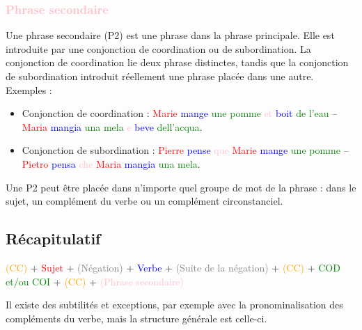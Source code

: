 \documentclass[12pt, openany]{report}
\begin{document}
\subsubsection{\textcolor{pink}{Phrase secondaire}}
Une phrase secondaire (P2) est une phrase dans la phrase principale. Elle est introduite par une conjonction de coordination ou de subordination. La conjonction de coordination lie deux phrase distinctes, tandis que la conjonction de subordination introduit réellement une phrase placée dans une autre.\\ Exemples : 
\begin{itemize}
    \item Conjonction de coordination : \textcolor{red}{Marie} \textcolor{blue}{mange} \textcolor{green}{une pomme} \textcolor{pink}{et} \textcolor{blue}{boit} \textcolor{green}{de l'eau} -- \textcolor{red}{Maria} \textcolor{blue}{mangia} \textcolor{green}{una mela} \textcolor{pink}{e} \textcolor{blue}{beve} \textcolor{green}{dell'acqua}.
    \item Conjonction de subordination : \textcolor{red}{Pierre} \textcolor{blue}{pense} \textcolor{pink}{que} \textcolor{red}{Marie} \textcolor{blue}{mange} \textcolor{green}{une pomme} -- \textcolor{red}{Pietro} \textcolor{blue}{pensa} \textcolor{pink}{che} \textcolor{red}{Maria} \textcolor{blue}{mangia} \textcolor{green}{una mela}.
\end{itemize}
Une P2 peut être placée dans n'importe quel groupe de mot de la phrase : dans le sujet, un complément du verbe ou un complément circonstanciel. 
\subsection{Récapitulatif}
\begin{center}
    \textcolor{orange}{(CC)} + \textcolor{red}{Sujet} + \textcolor{gray}{(Négation)} + \textcolor{blue}{Verbe} + \textcolor{gray}{(Suite de la négation)} + \textcolor{orange}{(CC)} + \textcolor{green}{COD et/ou COI} + \textcolor{orange}{(CC)} + \textcolor{pink}{(Phrase secondaire)}
\end{center}
Il existe des subtilités et exceptions, par exemple avec la pronominalisation des compléments du verbe, mais la structure générale est celle-ci. 
\end{document}
